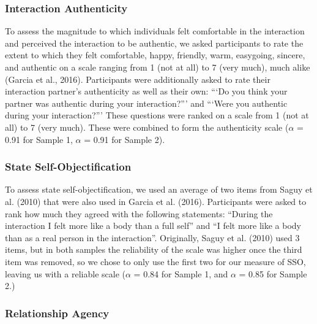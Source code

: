 \documentclass[man]{apa6}
\begin{document}
\subsubsection{Interaction Authenticity}\label{interaction-authenticity}

To assess the magnitude to which individuals felt comfortable in the
interaction and perceived the interaction to be authentic, we asked
participants to rate the extent to which they felt comfortable, happy,
friendly, warm, easygoing, sincere, and authentic on a scale ranging
from 1 (not at all) to 7 (very much), much alike (Garcia et al., 2016).
Participants were additionally asked to rate their interaction partner's
authenticity as well as their own: \enquote{`Do you think your partner
was authentic during your interaction?}' and \enquote{`Were you
authentic during your interaction?}' These questions were ranked on a
scale from 1 (not at all) to 7 (very much). These were combined to form
the authenticity scale (\(\alpha\) = 0.91 for Sample 1, \(\alpha\) =
0.91 for Sample 2).

\subsubsection{State
Self-Objectification}\label{state-self-objectification}

To assess state self-objectification, we used an average of two items
from Saguy et al. (2010) that were also used in Garcia et al. (2016).
Participants were asked to rank how much they agreed with the following
statements: \enquote{During the interaction I felt more like a body than
a full self} and \enquote{I felt more like a body than as a real person
in the interaction}. Originally, Saguy et al. (2010) used 3 items, but
in both samples the reliability of the scale was higher once the third
item was removed, so we chose to only use the first two for our measure
of SSO, leaving us with a reliable scale (\(\alpha\) = 0.84 for Sample
1, and \(\alpha\) = 0.85 for Sample 2.)

\subsubsection{Relationship Agency}\label{relationship-agency}
\end{document}

